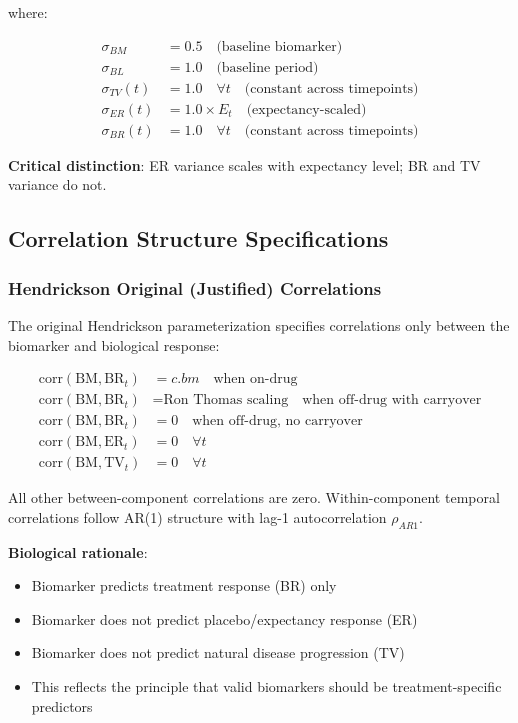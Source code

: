 \documentclass[12pt,a4paper]{article}
\begin{document}
where:

\begin{align}
\sigma_{BM} &= 0.5 \quad \text{(baseline biomarker)}\\
\sigma_{BL} &= 1.0 \quad \text{(baseline period)}\\
\sigma_{TV}(t) &= 1.0 \quad \forall t \quad \text{(constant across timepoints)}\\
\sigma_{ER}(t) &= 1.0 \times E_t \quad \text{(expectancy-scaled)}\\
\sigma_{BR}(t) &= 1.0 \quad \forall t \quad \text{(constant across timepoints)}
\end{align}

\textbf{Critical distinction}: ER variance scales with expectancy level; BR and TV variance do not.

\subsection{Correlation Structure Specifications}

\subsubsection{Hendrickson Original (Justified) Correlations}

The original Hendrickson parameterization specifies correlations only between the biomarker and biological response:

\begin{align}
\text{corr}(\text{BM}, \text{BR}_t) &= c.bm \quad \text{when on-drug}\\
\text{corr}(\text{BM}, \text{BR}_t) &= \text{Ron Thomas scaling} \quad \text{when off-drug with carryover}\\
\text{corr}(\text{BM}, \text{BR}_t) &= 0 \quad \text{when off-drug, no carryover}\\
\text{corr}(\text{BM}, \text{ER}_t) &= 0 \quad \forall t\\
\text{corr}(\text{BM}, \text{TV}_t) &= 0 \quad \forall t
\end{align}

All other between-component correlations are zero. Within-component temporal correlations follow AR(1) structure with lag-1 autocorrelation $\rho_{AR1}$.

\textbf{Biological rationale}:
\begin{itemize}
\item Biomarker predicts treatment response (BR) only
\item Biomarker does not predict placebo/expectancy response (ER)
\item Biomarker does not predict natural disease progression (TV)
\item This reflects the principle that valid biomarkers should be treatment-specific predictors
\end{itemize}
\end{document}

